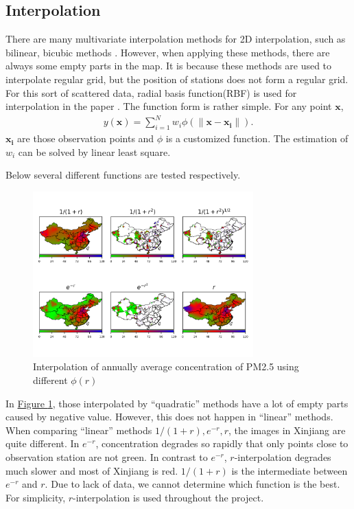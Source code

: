 \documentclass[letterpaper]{article}
\begin{document}
\begin{CJK*}{UTF8}{gkai}
  \section{Interpolation}

  There are many multivariate interpolation methods for 2D interpolation, such as bilinear, bicubic methods . However, when applying these methods, there are always some empty parts in the map. It is because these methods are used to interpolate regular grid, but the position of stations does not form a regular grid. For this sort of scattered data, radial basis function(RBF) is used for interpolation in the paper . The function form is rather simple. For any point $\mathbf{x}$,
  \begin{eqnarray}
    y(\mathbf{x}) = \sum_{i=1}^Nw_i\phi\left(\|\mathbf{x} - \mathbf{x_i}\|\right).
  \end{eqnarray}
  $\mathbf{x_i}$ are those observation points and $\phi$ is a customized function. The estimation of $w_i$ can be solved by linear least square.

  Below several different functions are tested respectively.

  \begin{figure}[h]
    \includegraphics[width = 8.5cm]{Interpolation_from_20150102_to_20151231.png}
    \caption{Interpolation of annually average concentration of PM2.5 using different
      $\phi(r)$}
    \label{figure:0}
    \centering
  \end{figure}

  In \hyperref[figure:0]{Figure \ref*{figure:0}}, those interpolated by ``quadratic'' methods have a lot of empty parts caused by negative value. However, this does not happen in ``linear'' methods. When comparing ``linear'' methods $1/(1+r), e^{-r}, r$, the images in Xinjiang are quite different. In $e^{-r}$, concentration degrades so rapidly that only points close to observation station are not green. In contrast to $e^{-r}$, $r$-interpolation degrades much slower and most of Xinjiang is red. $1/(1+r)$ is the intermediate between $e^{-r}$ and $r$. Due to lack of data, we cannot determine which function is the best. For simplicity, $r$-interpolation is used throughout the project.


\end{CJK*}
\end{document}
